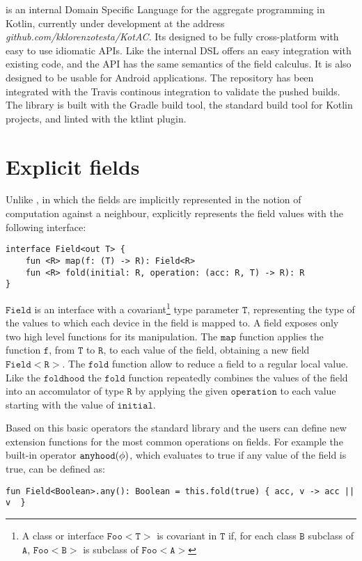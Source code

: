 \Kotac{} is an internal Domain Specific Language for the aggregate programming in Kotlin, currently under development at the address \textit{github.com/kklorenzotesta/KotAC}. Its designed to be fully cross-platform with easy to use idiomatic APIs. Like \Scafi{} the internal DSL offers an easy integration with existing code, and the API has the same semantics of the field calculus. It is also designed to be usable for Android applications. The repository has been integrated with the Travis \cite{Travis} continous integration to validate the pushed builds. The library is built with the Gradle \cite{Gradle} build tool, the standard build tool for Kotlin projects, and linted with the ktlint \cite{ktlint} plugin.

\section{Explicit fields}
Unlike \Scafi{}, in which the fields are implicitly represented in the notion of computation against a neighbour, \Kotac{} explicitly represents the field values with the following interface:
\begin{lstlisting}[language={kotac}]
interface Field<out T> {
    fun <R> map(f: (T) -> R): Field<R>
    fun <R> fold(initial: R, operation: (acc: R, T) -> R): R
}
\end{lstlisting}
$\mathtt{Field}$ is an interface with a covariant\footnote{A class or interface $\mathtt{Foo<T>}$ is covariant in $\mathtt{T}$ if, for each class $\mathtt{B}$ subclass of $\mathtt{A}$, $\mathtt{Foo<B>}$ is subclass of $\mathtt{Foo<A>}$} type parameter $\mathtt{T}$, representing the type of the values to which each device in the field is mapped to. A field exposes only two high level functions for its manipulation. The $\mathtt{map}$ function applies the function $\mathtt{f}$, from $\mathtt{T}$ to $\mathtt{R}$, to each value of the field, obtaining a new field $\mathtt{Field<R>}$. The $\mathtt{fold}$ function allow to reduce a field to a regular local value. Like the \Scafi{} $\mathtt{foldhood}$ the $\mathtt{fold}$ function repeatedly combines the values of the field into an accomulator of type $\mathtt{R}$ by applying the given $\mathtt{operation}$ to each value starting with the value of $\mathtt{initial}$.

Based on this basic operators the \Kotac{} standard library and the users can define new extension functions for the most common operations on fields. For example the built-in operator $\mathtt{anyhood}(\phi)$, which evaluates to true if any value of the field is true, can be defined as:
\begin{lstlisting}[language={kotac}]
fun Field<Boolean>.any(): Boolean = this.fold(true) { acc, v -> acc || v  }
\end{lstlisting}

